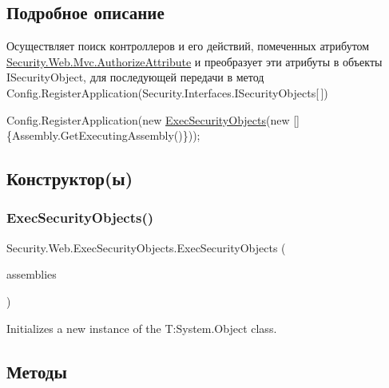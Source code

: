 \subsection{Подробное описание}
Осуществляет поиск контроллеров и его действий, помеченных атрибутом \hyperlink{class_security_1_1_web_1_1_mvc_1_1_authorize_attribute}{Security.\+Web.\+Mvc.\+Authorize\+Attribute} и преобразует эти атрибуты в объекты I\+Security\+Object, для последующей передачи в метод Config.\+Register\+Application(\+Security.\+Interfaces.\+I\+Security\+Objects\mbox{[}$\,$\mbox{]}) 

{\ttfamily  Config.\+Register\+Application(new \hyperlink{class_security_1_1_web_1_1_exec_security_objects}{Exec\+Security\+Objects}(new \mbox{[}\mbox{]}\{Assembly.\+Get\+Executing\+Assembly()\})); } 

\subsection{Конструктор(ы)}
\mbox{\label{class_security_1_1_web_1_1_exec_security_objects_ac4684f99a5b5b39fd677eb74c741a0af}} 
\subsubsection{\texorpdfstring{Exec\+Security\+Objects()}{ExecSecurityObjects()}}
{\footnotesize\ttfamily Security.\+Web.\+Exec\+Security\+Objects.\+Exec\+Security\+Objects (\begin{DoxyParamCaption}\item[{I\+Enumerable$<$ Assembly $>$}]{assemblies }\end{DoxyParamCaption})}



Initializes a new instance of the T\+:\+System.\+Object class. 



\subsection{Методы}
\mbox{\label{class_security_1_1_web_1_1_exec_security_objects_ab850ef8580c7aba16657c2711e67f883}} 
